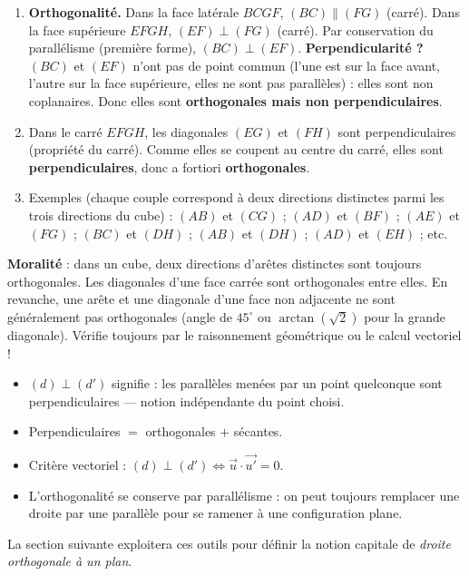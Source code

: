 \documentclass[11pt]{article}
\begin{document}
\begin{corrige}[Exercice]
\begin{enumerate}
\item \textbf{Orthogonalité.} Dans la face latérale $BCGF$, $(BC)\parallel(FG)$ (carré). Dans la face supérieure $EFGH$, $(EF)\perp(FG)$ (carré). Par conservation du parallélisme (première forme), $(BC)\perp(EF)$.
\textbf{Perpendicularité ?} $(BC)$ et $(EF)$ n'ont pas de point commun (l'une est sur la face avant, l'autre sur la face supérieure, elles ne sont pas parallèles) : elles sont non coplanaires. Donc elles sont \textbf{orthogonales mais non perpendiculaires}.
\item Dans le carré $EFGH$, les diagonales $(EG)$ et $(FH)$ sont perpendiculaires (propriété du carré). Comme elles se coupent au centre du carré, elles sont \textbf{perpendiculaires}, donc a fortiori \textbf{orthogonales}.
\item Exemples (chaque couple correspond à deux directions distinctes parmi les trois directions du cube) : $(AB)$ et $(CG)$ ; $(AD)$ et $(BF)$ ; $(AE)$ et $(FG)$ ; $(BC)$ et $(DH)$ ; $(AB)$ et $(DH)$ ; $(AD)$ et $(EH)$ ; etc.
\end{enumerate}
\textbf{Moralité} : dans un cube, deux directions d'arêtes distinctes sont toujours orthogonales. Les diagonales d'une face carrée sont orthogonales entre elles. En revanche, une arête et une diagonale d'une face non adjacente ne sont généralement pas orthogonales (angle de $45^\circ$ ou $\arctan(\sqrt{2})$ pour la grande diagonale). Vérifie toujours par le raisonnement géométrique ou le calcul vectoriel !
\end{corrige}

\begin{aretenir}
\begin{itemize}
\item $(d)\perp(d')$ signifie : les parallèles menées par un point quelconque sont perpendiculaires — notion indépendante du point choisi.
\item Perpendiculaires $=$ orthogonales $+$ sécantes.
\item Critère vectoriel : $(d)\perp(d') \iff \vec{u}\cdot\vec{u'}=0$.
\item L'orthogonalité se conserve par parallélisme : on peut toujours remplacer une droite par une parallèle pour se ramener à une configuration plane.
\end{itemize}
La section suivante exploitera ces outils pour définir la notion capitale de \emph{droite orthogonale à un plan}.
\end{aretenir}
\end{document}
